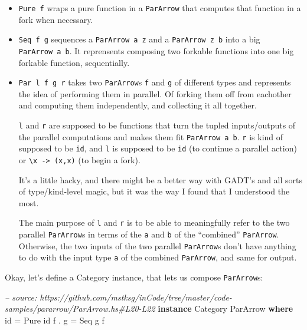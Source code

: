 \documentclass[]{article}
\newenvironment{Shaded}{}{}
\newcommand{\KeywordTok}[1]{\textcolor[rgb]{0.00,0.44,0.13}{\textbf{#1}}}
\newcommand{\DataTypeTok}[1]{\textcolor[rgb]{0.56,0.13,0.00}{#1}}
\newcommand{\CommentTok}[1]{\textcolor[rgb]{0.38,0.63,0.69}{\textit{#1}}}
\newcommand{\FunctionTok}[1]{\textcolor[rgb]{0.02,0.16,0.49}{#1}}
\newcommand{\NormalTok}[1]{#1}
\begin{document}
\begin{itemize}
\item
  \texttt{Pure\ f} wraps a pure function in a \texttt{ParArrow} that computes
  that function in a fork when necessary.
\item
  \texttt{Seq\ f\ g} sequences a \texttt{ParArrow\ a\ z} and a
  \texttt{ParArrow\ z\ b} into a big \texttt{ParArrow\ a\ b}. It reprensents
  composing two forkable functions into one big forkable function, sequentially.
\item
  \texttt{Par\ l\ f\ g\ r} takes two \texttt{ParArrow}s \texttt{f} and
  \texttt{g} of different types and represents the idea of performing them in
  parallel. Of forking them off from eachother and computing them independently,
  and collecting it all together.

  \texttt{l} and \texttt{r} are supposed to be functions that turn the tupled
  inputs/outputs of the parallel computations and makes them fit
  \texttt{ParArrow\ a\ b}. \texttt{r} is kind of supposed to be \texttt{id}, and
  \texttt{l} is supposed to be \texttt{id} (to continue a parallel action) or
  \texttt{\textbackslash{}x\ -\textgreater{}\ (x,x)} (to begin a fork).

  It's a little hacky, and there might be a better way with GADT's and all sorts
  of type/kind-level magic, but it was the way I found that I understood the
  most.

  The main purpose of \texttt{l} and \texttt{r} is to be able to meaningfully
  refer to the two parallel \texttt{ParArrow}s in terms of the \texttt{a} and
  \texttt{b} of the ``combined'' \texttt{ParArrow}. Otherwise, the two inputs of
  the two parallel \texttt{ParArrow}s don't have anything to do with the input
  type \texttt{a} of the combined \texttt{ParArrow}, and same for output.
\end{itemize}

Okay, let's define a Category instance, that lets us compose \texttt{ParArrow}s:

\begin{Shaded}
\begin{Highlighting}[]
\CommentTok{-- source: https://github.com/mstksg/inCode/tree/master/code-samples/pararrow/ParArrow.hs#L20-L22}
\KeywordTok{instance} \DataTypeTok{Category} \DataTypeTok{ParArrow} \KeywordTok{where}
\NormalTok{    id    }\FunctionTok{=} \DataTypeTok{Pure}\NormalTok{ id}
\NormalTok{    f }\FunctionTok{.}\NormalTok{ g }\FunctionTok{=} \DataTypeTok{Seq}\NormalTok{ g f}
\end{Highlighting}
\end{Shaded}
\end{document}
